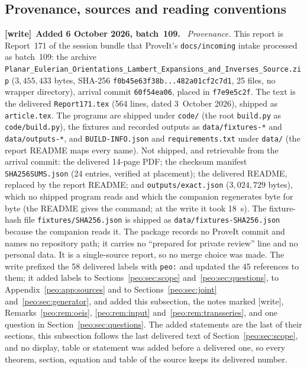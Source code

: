 \documentclass[11pt]{article}
\numberwithin{equation}{section}
\theoremstyle{remark}\newtheorem{remark}[theorem]{Remark}
\newcommand{\file}[1]{\nolinkurl{#1}}
\newenvironment{writenote}[1][]{\par\smallskip\begingroup\small
 \noindent\textbf{[write]}\if\relax\detokenize{#1}\relax\else~\textbf{#1.}\fi\ }%
 {\par\endgroup\smallskip}
\begin{document}
\subsection{Provenance, sources and reading conventions}\label{peo:sec:provenance}
\begin{writenote}[Added 6 October 2026, batch~109]
\emph{Provenance.} This report is Report~171 of the session bundle that
ProveIt's \file{docs/incoming} intake processed as batch~109: the archive
\file{Planar_Eulerian_Orientations_Lambert_Expansions_and_Inverses_Source.zip}
($3{,}455{,}433$ bytes, SHA-256 \file{f0b45e63f38b...482a01cf2c7d1}, 25
files, no wrapper directory), arrival commit \file{60f54ea06}, placed in
\file{f7e9e5c2f}. The text is the delivered \file{Report171.tex} (564
lines, dated 3~October 2026), shipped as \file{article.tex}. The programs
are shipped under \file{code/} (the root \file{build.py} as
\file{code/build.py}), the fixtures and recorded outputs as
\file{data/fixtures-*} and \file{data/outputs-*}, and \file{BUILD-INFO.json}
and \file{requirements.txt} under \file{data/} (the report README maps every
name). Not shipped, and retrievable from the arrival commit: the delivered
14-page PDF; the checksum manifest \file{SHA256SUMS.json} (24 entries,
verified at placement); the delivered README, replaced by the report
README; and \file{outputs/exact.json} ($3{,}024{,}729$ bytes), which no
shipped program reads and which the companion regenerates byte for byte
(the README gives the command; at the write it took 18~s). The fixture-hash
file \file{fixtures/SHA256.json} is shipped as \file{data/fixtures-SHA256.json}
because the companion reads it. The package records no ProveIt commit and
names no repository path; it carries no ``prepared for private review'' line
and no personal data. It is a single-source report, so no merge choice was
made. The write prefixed the 58 delivered labels with \file{peo:} and
updated the 45 references to them; it added labels to
Sections~\ref{peo:sec:scope} and~\ref{peo:sec:questions}, to
Appendix~\ref{peo:app:sources} and to Sections~\ref{peo:sec:joint}
and~\ref{peo:sec:generator}, and added this subsection, the notes marked
[write], Remarks~\ref{peo:rem:oeis}, \ref{peo:rem:input}
and~\ref{peo:rem:transseries}, and one question in
Section~\ref{peo:sec:questions}. The added
statements are the last of their sections, this subsection follows the last
delivered text of Section~\ref{peo:sec:scope}, and no display, table or
statement was added before a delivered one, so every theorem, section,
equation and table of the source keeps its delivered number.


\end{writenote}
\end{document}
